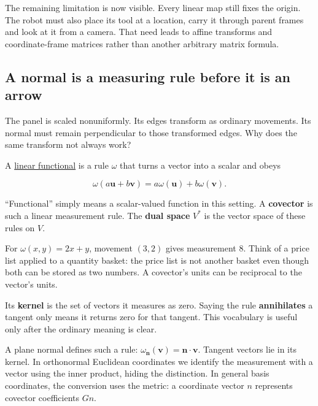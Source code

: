 The remaining limitation is now visible. Every linear map still fixes the origin. The robot must also place its tool at a location, carry it through parent frames and look at it from a camera. That need leads to affine transforms and coordinate-frame matrices rather than another arbitrary matrix formula.

\subsection{A normal is a measuring rule before it is an arrow}\label{01-foundations-i-ch018-a-normal-is-a-measuring-rule-before-it-is-an-arrow}

\hypertarget{01-foundations-i-ch018-a-normal-is-a-measuring-rule-before-it-is-an-arrow}{}

The panel is scaled nonuniformly. Its edges transform as ordinary movements. Its normal must remain perpendicular to those transformed edges. Why does the same transform not always work?

A \hyperref[01-foundations-i-ch019-normals-undo-scale-before-following-rotation]{linear functional} is a rule \(\omega\) that turns a vector into a scalar and obeys

\[
\omega(a\mathbf u+b\mathbf v)=a\omega(\mathbf u)+b\omega(\mathbf v).
\]

``Functional'' simply means a scalar-valued function in this setting. A \textbf{covector} is such a linear measurement rule. The \textbf{dual space} \(V^*\) is the vector space of these rules on \(V\).

For \(\omega(x,y)=2x+y\), movement \((3,2)\) gives measurement \(8\). Think of a price list applied to a quantity basket: the price list is not another basket even though both can be stored as two numbers. A covector's units can be reciprocal to the vector's units.

Its \textbf{kernel} is the set of vectors it measures as zero. Saying the rule \textbf{annihilates} a tangent only means it returns zero for that tangent. This vocabulary is useful only after the ordinary meaning is clear.

A plane normal defines such a rule: \(\omega_{\mathbf n}(\mathbf v)=\mathbf n\cdot\mathbf v\). Tangent vectors lie in its kernel. In orthonormal Euclidean coordinates we identify the measurement with a vector using the inner product, hiding the distinction. In general basis coordinates, the conversion uses the metric: a coordinate vector \(n\) represents covector coefficients \(Gn\).

